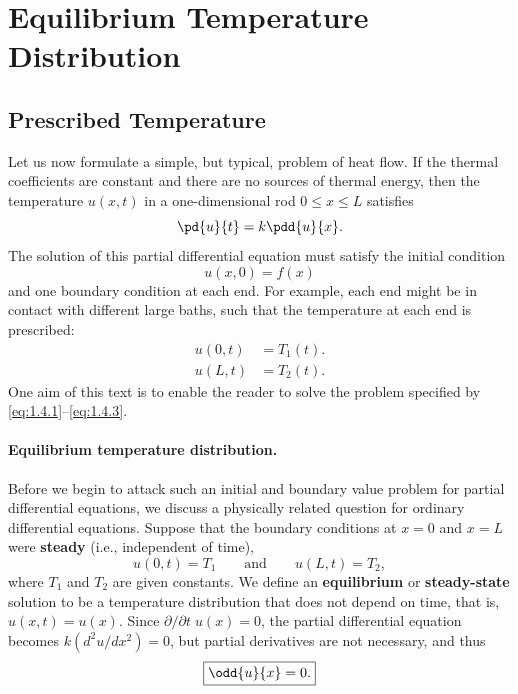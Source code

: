 
\section{Equilibrium Temperature Distribution}
\label{sec:1.4}

\subsection{Prescribed Temperature}
\label{sec:1.4.1}

Let us now formulate a simple, but typical, problem of heat flow. If the thermal coefficients are constant and there are no sources of thermal energy, then the temperature $u(x,t)$ in a one-dimensional rod $0 \le x \le L$ satisfies
\begin{equation}
\pd{u}{t} = k\pdd{u}{x}.
\label{eq:1.4.1}
\end{equation}
The solution of this partial differential equation must satisfy the initial condition
\begin{equation}
u(x,0) = f(x)
\label{eq:1.4.2}
\end{equation}
and one boundary condition at each end. For example, each end might be in contact with different large baths, such that the temperature at each end is prescribed:
\begin{equation}
\begin{aligned}
u(0,t) &= T_1(t). \\
u(L,t) &= T_2(t).
\end{aligned}
\label{eq:1.4.3}
\end{equation}
One aim of this text is to enable the reader to solve the problem specified by \eqref{eq:1.4.1}--\eqref{eq:1.4.3}.

\paragraph{Equilibrium temperature distribution.}
Before we begin to attack such an initial and boundary value problem for partial differential equations, we discuss a physically related question for ordinary differential equations. Suppose that the boundary conditions at $x = 0$ and $x = L$ were \textbf{steady} (i.e., independent of time),
\[
u(0,t) = T_1 \qquad \text{and} \qquad u(L,t) = T_2,
\]
where $T_1$ and $T_2$ are given constants. We define an \textbf{equilibrium} or \textbf{steady-state} solution to be a temperature distribution that does not depend on time, that is, $u(x,t) = u(x)$. Since $\partial/\partial t\; u(x) = 0$, the partial differential equation becomes $k(d^2u/dx^2) = 0$, but partial derivatives are not necessary, and thus
\begin{equation}
\boxed{\odd{u}{x} = 0.}
\label{eq:1.4.4}
\end{equation}

